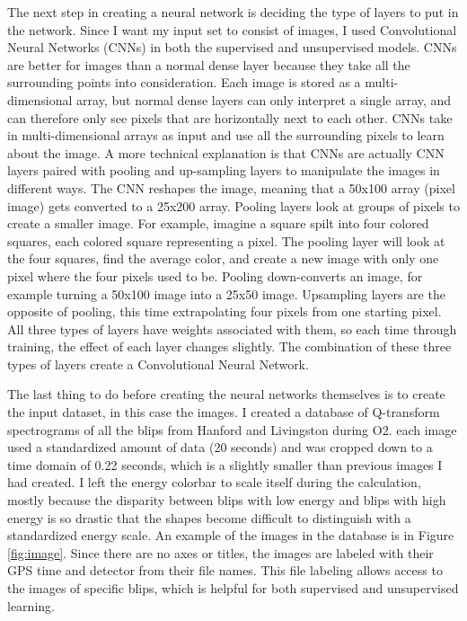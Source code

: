 \documentclass[a4paper]{article}
\begin{document}
The next step in creating a neural network is deciding the type of layers to put in the network. Since I want my input set to consist of images, I used Convolutional Neural Networks (CNNs) in both the supervised and unsupervised models. CNNs are better for images than a normal dense layer because they take all the surrounding points into consideration. Each image is stored as a multi-dimensional array, but normal dense layers can only interpret a single array, and can therefore only see pixels that are horizontally next to each other. CNNs take in multi-dimensional arrays as input and use all the surrounding pixels to learn about the image. A more technical explanation is that CNNs are actually CNN layers paired with pooling and up-sampling layers to manipulate the images in different ways. The CNN reshapes the image, meaning that a 50x100 array (pixel image) gets converted to a 25x200 array. Pooling layers look at groups of pixels to create a smaller image. For example, imagine a square spilt into four colored squares, each colored square representing a pixel. The pooling layer will look at the four squares, find the average color, and create a new image with only one pixel where the four pixels used to be. Pooling down-converts an image, for example turning a 50x100 image into a 25x50 image. Upsampling layers are the opposite of pooling, this time extrapolating four pixels from one starting pixel. All three types of layers have weights associated with them, so each time through training, the effect of each layer changes slightly. The combination of these three types of layers create a Convolutional Neural Network.

The last thing to do before creating the neural networks themselves is to create the input dataset, in this case the images. I created a database of Q-transform spectrograms of all the blips from Hanford and Livingston during O2. each image used a standardized amount of data (20 seconds) and was cropped down to a time domain of 0.22 seconds, which is a slightly smaller than previous images I had created. I left the energy colorbar to scale itself during the calculation, mostly because the disparity between blips with low energy and blips with high energy is so drastic that the shapes become difficult to distinguish with a standardized energy scale. An example of the images in the database is in Figure \ref{fig:image}. Since there are no axes or titles, the images are labeled with their GPS time and detector from their file names. This file labeling allows access to the images of specific blips, which is helpful for both supervised and unsupervised learning.
\end{document}
